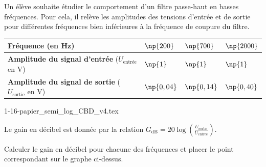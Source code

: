 
\initialisationEntrainement

Un élève souhaite étudier le comportement d'un filtre passe-haut en basses fréquences. Pour cela, il relève les amplitudes des tensions d'entrée et de sortie pour différentes fréquences bien inférieures à la fréquence de coupure du filtre. 
\begin{center}
\renewcommand{\arraystretch}{1.2}
	\begin{tabular}{| p{8cm}| p{1.5cm} |p{1.5cm}|p{1.5cm}|}
		\hline
		\textbf{Fréquence} (en \si{Hz})&  $\np{200}$  &   $\np{700}$  &   $\np{2000}$    \\
			\hline	
		\textbf{Amplitude du signal d'entrée}  ($U_{\text{entrée}}$ en \si{V})  &    $\np{1}$	&      $\np{1}$   &     $\np{1}$      \\
			\hline	
			\textbf{Amplitude du signal de sortie}  ($U_{\text{sortie}}$ en \si{V})  &    $\np{0,04}$	&     $\np{0,14}$   &    $\np{0,40}$      \\
			\hline	
	\end{tabular}
	\renewcommand{\arraystretch}{1}
\end{center}
%
\begin{center}
	{1-16-papier_semi_log_CBD_v4.tex}
\end{center}
%

Le gain en décibel est donnée par la relation $G_{\text{dB}}=20 \log \left(\frac{U_{\text{sortie}}}{U_{\text{entrée}}}\right)$.

Calculer le gain en décibel pour chacune des fréquences et placer le point correspondant sur le graphe ci-dessus.

\debutEntrainement

